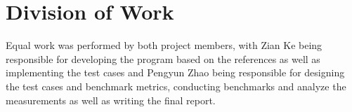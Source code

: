 \documentclass[12pt]{article}
\begin{document}
\section{Division of Work}
Equal work was performed by both project members, with Zian Ke being responsible for developing the program based on the references as well as implementing the test cases and Pengyun Zhao being responsible for designing the test cases and benchmark metrics, conducting benchmarks and analyze the measurements as well as writing the final report.
\end{document}
